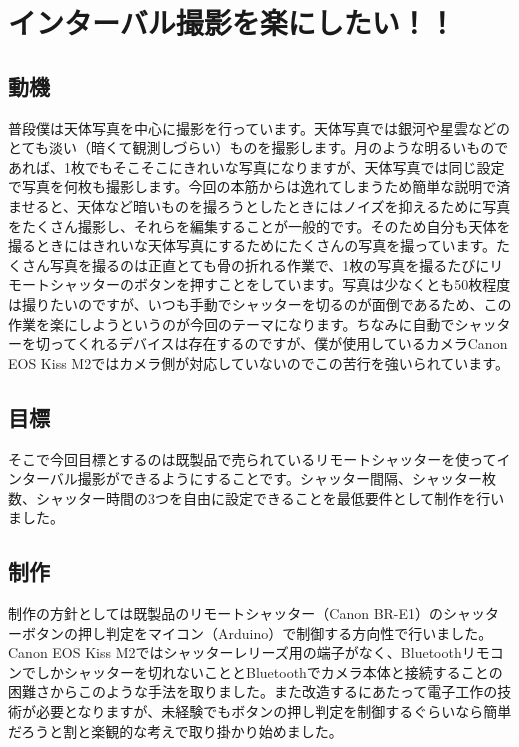 \documentclass[../main]{subfiles}
\begin{document}
\chapter{インターバル撮影を楽にしたい！！} %
\section{動機}
普段僕は天体写真を中心に撮影を行っています。天体写真では銀河や星雲などのとても淡い（暗くて観測しづらい）ものを撮影します。月のような明るいものであれば、1枚でもそこそこにきれいな写真になりますが、天体写真では同じ設定で写真を何枚も撮影します。今回の本筋からは逸れてしまうため簡単な説明で済ませると、天体など暗いものを撮ろうとしたときにはノイズを抑えるために写真をたくさん撮影し、それらを編集することが一般的です。そのため自分も天体を撮るときにはきれいな天体写真にするためにたくさんの写真を撮っています。たくさん写真を撮るのは正直とても骨の折れる作業で、1枚の写真を撮るたびにリモートシャッターのボタンを押すことをしています。写真は少なくとも50枚程度は撮りたいのですが、いつも手動でシャッターを切るのが面倒であるため、この作業を楽にしようというのが今回のテーマになります。ちなみに自動でシャッターを切ってくれるデバイスは存在するのですが、僕が使用しているカメラCanon EOS Kiss M2ではカメラ側が対応していないのでこの苦行を強いられています。

\section{目標}
そこで今回目標とするのは既製品で売られているリモートシャッターを使ってインターバル撮影ができるようにすることです。シャッター間隔、シャッター枚数、シャッター時間の3つを自由に設定できることを最低要件として制作を行いました。

\section{制作}
制作の方針としては既製品のリモートシャッター（Canon BR-E1）のシャッターボタンの押し判定をマイコン（Arduino）で制御する方向性で行いました。Canon EOS Kiss M2ではシャッターレリーズ用の端子がなく、Bluetoothリモコンでしかシャッターを切れないこととBluetoothでカメラ本体と接続することの困難さからこのような手法を取りました。また改造するにあたって電子工作の技術が必要となりますが、未経験でもボタンの押し判定を制御するぐらいなら簡単だろうと割と楽観的な考えで取り掛かり始めました。
\end{document}
